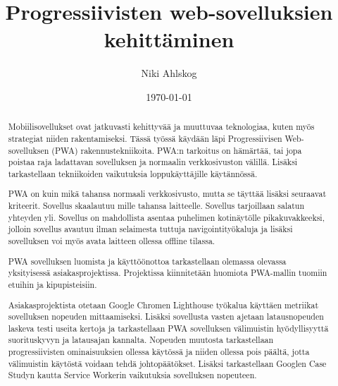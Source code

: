 \documentclass{tktltiki}
\begin{document}
\singlespacing

\title{Progressiivisten web-sovelluksien kehittäminen}
\author{Niki Ahlskog}

\date{\today}

\maketitle






\begin{abstract}

Mobiilisovellukset ovat jatkuvasti kehittyvää ja muuttuvaa teknologiaa, kuten myös strategiat niiden rakentamiseksi. Tässä työssä käydään läpi Progressiivisen Web-sovelluksen (PWA) rakennustekniikoita. PWA:n tarkoitus on hämärtää, tai jopa poistaa raja ladattavan sovelluksen ja normaalin verkkosivuston välillä. Lisäksi tarkastellaan tekniikoiden vaikutuksia loppukäyttäjille käytännössä.

PWA on kuin mikä tahansa normaali verkkosivusto, mutta se täyttää lisäksi seuraavat kriteerit. Sovellus skaalautuu mille tahansa laitteelle. Sovellus tarjoillaan salatun yhteyden yli. Sovellus on mahdollista asentaa puhelimen kotinäytölle pikakuvakkeeksi, jolloin sovellus avautuu ilman selaimesta tuttuja navigointityökaluja ja lisäksi sovelluksen voi myös avata laitteen ollessa offline tilassa. 

PWA sovelluksen luomista ja käyttöönottoa tarkastellaan olemassa olevassa yksityisessä asiakasprojektissa. Projektissa kiinnitetään huomiota PWA-mallin tuomiin etuihin ja kipupisteisiin.

Asiakasprojektista otetaan Google Chromen Lighthouse työkalua käyttäen metriikat sovelluksen nopeuden mittaamiseksi. Lisäksi sovellusta vasten ajetaan latausnopeuden
laskeva testi useita kertoja ja tarkastellaan PWA sovelluksen välimuistin hyödyllisyyttä suorituskyvyn ja latausajan kannalta. Nopeuden muutosta tarkastellaan 
progressiivisten ominaisuuksien ollessa käytössä ja niiden ollessa pois päältä, jotta välimuistin käytöstä voidaan tehdä johtopäätökset. Lisäksi tarkastellaan Googlen 
Case Studyn kautta Service Workerin vaikutuksia sovelluksen nopeuteen. \end{abstract}
\end{document}
